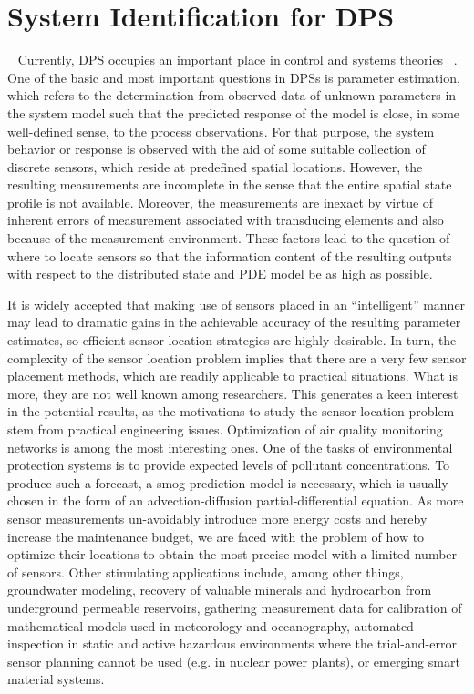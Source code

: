 \section{System Identification for DPS}~\label{s:sid}
Currently, DPS occupies an important place in control and systems theories ~\cite{Christofides2001,CurtainZwart1995, Lasiecka2000, Neittaanmaki1994, Omatu1989, Zwart1997}.
One of the basic and most important questions in DPSs is parameter estimation, which refers to the determination from observed data of unknown parameters in the system model such that the predicted response of the model is close, in some well-defined sense, to the process observations. For that purpose, the system behavior or response is observed with the aid of some suitable collection of discrete sensors, which reside at predefined spatial locations.
    However, the resulting measurements are incomplete in the sense that the entire spatial state profile is not available. Moreover, the measurements are inexact by virtue of inherent errors of measurement associated with transducing elements and also because of the measurement environment. These factors lead to the question of where to locate sensors so that the information content of the resulting outputs with respect to the distributed state and PDE model be as high as possible.


    It is widely accepted that making use of sensors placed in an ``intelligent'' manner may lead to dramatic gains in the achievable accuracy of the resulting parameter estimates, so efficient sensor location strategies are highly desirable. In turn, the complexity of the sensor location problem implies that there are a very few sensor placement methods, which are readily applicable to practical situations. What is more, they are not well known among researchers. This generates a keen interest in the potential results, as the motivations to study the sensor location problem stem from practical engineering issues. Optimization of air quality monitoring networks is among the most interesting ones. One of the tasks of environmental protection systems is to provide expected levels of pollutant concentrations.
        To produce such a forecast, a smog prediction model is necessary, which is usually chosen in the form of an advection-diffusion partial-differential equation. As more sensor measurements un-avoidably introduce more energy costs and hereby increase the maintenance budget, we are faced with the problem of how to optimize their locations to obtain the most precise model with a limited number of sensors. Other stimulating applications include, among other things,
groundwater modeling, recovery of valuable minerals and hydrocarbon from underground permeable reservoirs, gathering measurement data for calibration of mathematical models used in meteorology and oceanography, automated inspection in static and active hazardous
environments where the trial-and-error sensor planning cannot be used (e.g. in nuclear power plants), or emerging smart material systems.


